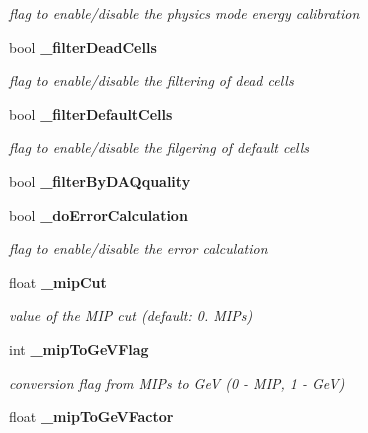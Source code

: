\begin{DoxyCompactItemize}
\begin{DoxyCompactList}\small\item\em flag to enable/disable the physics mode energy calibration \end{DoxyCompactList}\item 
bool {\bf \-\_\-filter\-Dead\-Cells}\label{classCALICE_1_1Ahc2CalibrateProcessor_af1da32722c145038b42b025b34d451e9}

\begin{DoxyCompactList}\small\item\em flag to enable/disable the filtering of dead cells \end{DoxyCompactList}\item 
bool {\bf \-\_\-filter\-Default\-Cells}\label{classCALICE_1_1Ahc2CalibrateProcessor_afd38d20f0310d2ce016d80493a25c651}

\begin{DoxyCompactList}\small\item\em flag to enable/disable the filgering of default cells \end{DoxyCompactList}\item 
bool {\bfseries \-\_\-filter\-By\-D\-A\-Qquality}\label{classCALICE_1_1Ahc2CalibrateProcessor_a8f30adee1c7c058cead393f36b92e553}

\item 
bool {\bf \-\_\-do\-Error\-Calculation}\label{classCALICE_1_1Ahc2CalibrateProcessor_a14fc5b04c571329bde618c70e5aa9885}

\begin{DoxyCompactList}\small\item\em flag to enable/disable the error calculation \end{DoxyCompactList}\item 
float {\bf \-\_\-mip\-Cut}\label{classCALICE_1_1Ahc2CalibrateProcessor_a07cf5b93b24db2acad37b9c14b65011c}

\begin{DoxyCompactList}\small\item\em value of the M\-I\-P cut (default\-: 0. M\-I\-Ps) \end{DoxyCompactList}\item 
int {\bf \-\_\-mip\-To\-Ge\-V\-Flag}\label{classCALICE_1_1Ahc2CalibrateProcessor_a57684c698eda53958b7537201948ddaa}

\begin{DoxyCompactList}\small\item\em conversion flag from M\-I\-Ps to Ge\-V (0 -\/ M\-I\-P, 1 -\/ Ge\-V) \end{DoxyCompactList}\item 
float {\bf \-\_\-mip\-To\-Ge\-V\-Factor}\label{classCALICE_1_1Ahc2CalibrateProcessor_a7f34123a00ee631895bda7680794cfb6}


\end{DoxyCompactItemize}
